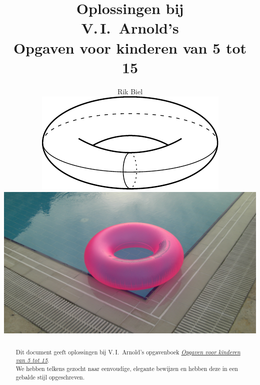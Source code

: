 
\usepackage{soul}
\setdefaultlanguage{dutch}
\DeclareSIUnit[number-unit-product=\,]
\renewcommand{\leq}{\leqslant}
\renewcommand{\geq}{\geqslant}

\title{Oplossingen bij\\V.\,I.~Arnold's\\Opgaven voor kinderen van 5 tot 15}
\author{Rik Biel
\vspace*{1.5cm}\\
\includegraphics[scale=0.43]{resources/74_torus}
\vspace*{0.5cm}\\
\includegraphics[scale=0.05]{resources/zwemband}
}
\date{}



\maketitle
\thispagestyle{empty}
\cleardoublepage
\setcounter{page}{1}

\begin{abstract}
Dit document geeft oplossingen bij V.\,I.~Arnold's opgavenboek \href{https://imaginary.org/sites/default/files/5to15_nl_nl.pdf}{\textit{Opgaven voor kinderen van 5 tot 15}}.\\

\noindent We hebben telkens gezocht naar eenvoudige, elegante bewijzen en hebben deze in een gebalde stijl opgeschreven.
\end{abstract}

